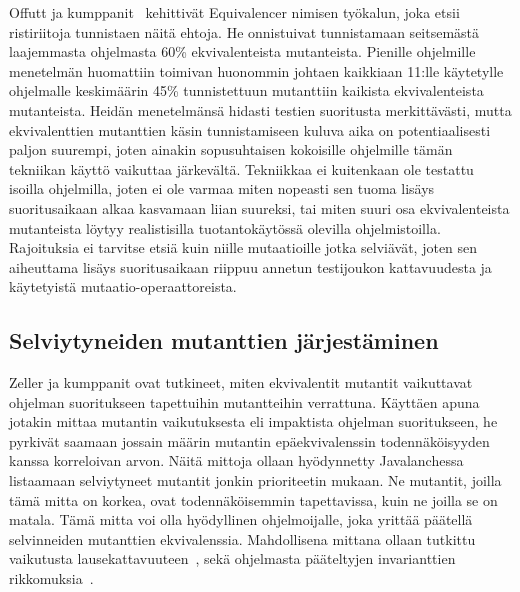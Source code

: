 \documentclass[finnish]{tktltiki2}
\begin{document}
Offutt ja kumppanit~\cite{507890} kehittivät Equivalencer nimisen työkalun, joka etsii ristiriitoja tunnistaen näitä ehtoja. He onnistuivat tunnistamaan seitsemästä laajemmasta ohjelmasta 60\% ekvivalenteista mutanteista. Pienille ohjelmille menetelmän huomattiin toimivan huonommin johtaen kaikkiaan 11:lle käytetylle ohjelmalle keskimäärin 45\% tunnistettuun mutanttiin kaikista ekvivalenteista mutanteista. Heidän menetelmänsä hidasti testien suoritusta merkittävästi, mutta ekvivalenttien mutanttien käsin tunnistamiseen kuluva aika on potentiaalisesti paljon suurempi, joten ainakin sopusuhtaisen kokoisille ohjelmille tämän tekniikan käyttö vaikuttaa järkevältä. Tekniikkaa ei kuitenkaan ole testattu isoilla ohjelmilla, joten ei ole varmaa miten nopeasti sen tuoma lisäys suoritusaikaan alkaa kasvamaan liian suureksi, tai miten suuri osa ekvivalenteista mutanteista löytyy realistisilla tuotantokäytössä olevilla ohjelmistoilla. Rajoituksia ei tarvitse etsiä kuin niille mutaatioille jotka selviävät, joten sen aiheuttama lisäys suoritusaikaan riippuu annetun testijoukon kattavuudesta ja käytetyistä mutaatio-operaattoreista.

\subsection{Selviytyneiden mutanttien järjestäminen}
Zeller ja kumppanit ovat tutkineet, miten ekvivalentit mutantit vaikuttavat ohjelman suoritukseen tapettuihin mutantteihin verrattuna. Käyttäen apuna jotakin mittaa mutantin vaikutuksesta eli impaktista ohjelman suoritukseen, he pyrkivät saamaan jossain määrin mutantin epäekvivalenssin todennäköisyyden kanssa korreloivan arvon. Näitä mittoja ollaan hyödynnetty Javalanchessa listaamaan selviytyneet mutantit jonkin prioriteetin mukaan. Ne mutantit, joilla tämä mitta on korkea, ovat todennäköisemmin tapettavissa, kuin ne joilla se on matala. Tämä mitta voi olla hyödyllinen ohjelmoijalle, joka yrittää päätellä selvinneiden mutanttien ekvivalenssia. Mahdollisena mittana ollaan tutkittu vaikutusta lausekattavuuteen~\cite{GrunSZ09, SchulerZ10}, sekä ohjelmasta pääteltyjen invarianttien rikkomuksia~\cite{SchulerDZ09}.
\end{document}
